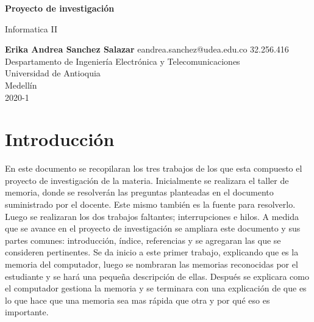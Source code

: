 \documentclass{article}
\begin{document}
\begin{titlepage}
    \begin{center}
        \vspace*{1cm}
            
        \Huge
        \textbf{Proyecto de investigación}
            
        \vspace{0.5cm}
        \LARGE
        Informatica II
            
        \vspace{1.5cm}
            
        \textbf{Erika Andrea Sanchez Salazar}
        \LARGE
         eandrea.sanchez@udea.edu.co
        32.256.416
        \vfill
        \vspace{0.8cm}
        \Large
        Despartamento de Ingeniería Electrónica y Telecomunicaciones\\
        Universidad de Antioquia\\
        Medellín\\
         2020-1
           
    \end{center}
\end{titlepage}

\tableofcontents
\newpage
\section{Introducción}\label{intro}
\vspace{0.5cm}
\noindent
En este documento se recopilaran los tres trabajos de los que esta compuesto el proyecto de investigación de la materia. 
\vspace{0.5cm}
\noindent
Inicialmente se realizara el taller de memoria, donde se resolverán las preguntas planteadas en el documento suministrado por el docente. Este mismo también es la fuente para resolverlo. Luego se realizaran los dos trabajos faltantes; interrupciones e hilos.
\noindent
\vspace{0.5cm}
A medida que se avance en el proyecto de investigación se ampliara este documento y sus partes comunes: introducción, índice, referencias y se agregaran las que se consideren pertinentes.
\noindent
\vspace{0.5cm}
Se da inicio a este primer trabajo, explicando que es la memoria del computador, luego se nombraran las memorias reconocidas por el estudiante y se hará una pequeña descripción de ellas. Después se explicara como el computador gestiona la memoria y se terminara con una explicación de que es lo que hace que una memoria sea mas rápida que otra y por qué eso es importante. 
\end{document}
